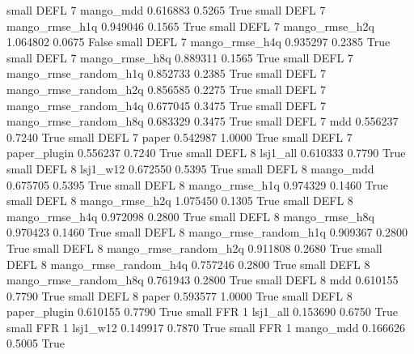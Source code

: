      small     DEFL                 7             mango_mdd   0.616883      0.5265    True
     small     DEFL                 7        mango_rmse_h1q   0.949046      0.1565    True
     small     DEFL                 7        mango_rmse_h2q   1.064802      0.0675   False
     small     DEFL                 7        mango_rmse_h4q   0.935297      0.2385    True
     small     DEFL                 7        mango_rmse_h8q   0.889311      0.1565    True
     small     DEFL                 7 mango_rmse_random_h1q   0.852733      0.2385    True
     small     DEFL                 7 mango_rmse_random_h2q   0.856585      0.2275    True
     small     DEFL                 7 mango_rmse_random_h4q   0.677045      0.3475    True
     small     DEFL                 7 mango_rmse_random_h8q   0.683329      0.3475    True
     small     DEFL                 7                   mdd   0.556237      0.7240    True
     small     DEFL                 7                 paper   0.542987      1.0000    True
     small     DEFL                 7          paper_plugin   0.556237      0.7240    True
     small     DEFL                 8              lsj1_all   0.610333      0.7790    True
     small     DEFL                 8              lsj1_w12   0.672550      0.5395    True
     small     DEFL                 8             mango_mdd   0.675705      0.5395    True
     small     DEFL                 8        mango_rmse_h1q   0.974329      0.1460    True
     small     DEFL                 8        mango_rmse_h2q   1.075450      0.1305    True
     small     DEFL                 8        mango_rmse_h4q   0.972098      0.2800    True
     small     DEFL                 8        mango_rmse_h8q   0.970423      0.1460    True
     small     DEFL                 8 mango_rmse_random_h1q   0.909367      0.2800    True
     small     DEFL                 8 mango_rmse_random_h2q   0.911808      0.2680    True
     small     DEFL                 8 mango_rmse_random_h4q   0.757246      0.2800    True
     small     DEFL                 8 mango_rmse_random_h8q   0.761943      0.2800    True
     small     DEFL                 8                   mdd   0.610155      0.7790    True
     small     DEFL                 8                 paper   0.593577      1.0000    True
     small     DEFL                 8          paper_plugin   0.610155      0.7790    True
     small      FFR                 1              lsj1_all   0.153690      0.6750    True
     small      FFR                 1              lsj1_w12   0.149917      0.7870    True
     small      FFR                 1             mango_mdd   0.166626      0.5005    True
